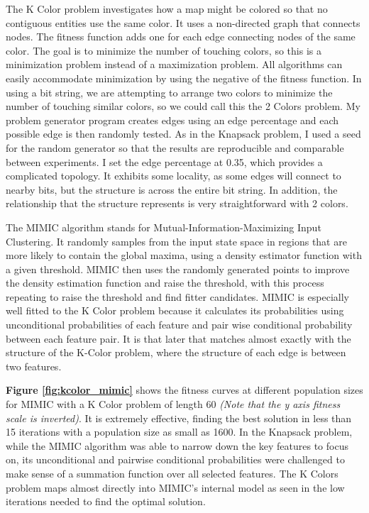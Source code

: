 \documentclass[letterpaper]{article} %
\begin{document}
The K Color problem investigates how a map might be colored so that no contiguous entities use the same color.  It uses a non-directed graph that connects nodes.  The fitness function adds one for each edge connecting nodes of the same color.  The goal is to minimize the number of touching colors, so this is a minimization problem instead of a maximization problem.  All algorithms can easily accommodate minimization by using the negative of the fitness function.   In using a bit string, we are attempting to arrange two colors to minimize the number of touching similar colors, so we could call this the 2 Colors problem.  My problem generator program creates edges using an edge percentage and each possible edge is then randomly tested.  As in the Knapsack problem, I used a seed for the random generator so that the results are reproducible and comparable between experiments.  I set the edge percentage at 0.35, which provides a complicated topology.  It exhibits some locality, as some edges will connect to nearby bits, but the structure is across the entire bit string.  In addition, the relationship that the structure represents is very straightforward with 2 colors. 

The MIMIC algorithm stands for Mutual-Information-Maximizing Input Clustering.  It randomly samples from the input state space in regions that are more likely to contain the global maxima, using a density estimator function with a given threshold.  MIMIC then uses the randomly generated points to improve the density estimation function and raise the threshold, with this process repeating to raise the threshold and find fitter candidates.  MIMIC is especially well fitted to the K Color problem because  it calculates its probabilities using unconditional probabilities of each feature and pair wise conditional probability between each feature pair.  It is that later that matches almost exactly with the structure of the K-Color problem, where the structure of each edge is between two features.  

\textbf{Figure \ref{fig:kcolor_mimic}} shows the fitness curves at different population sizes for MIMIC with a K Color problem of length 60  \emph{(Note that the y axis fitness scale is inverted)}.  It is extremely effective, finding the best solution in less than 15 iterations with a population size as small as 1600.  In the Knapsack problem, while the MIMIC algorithm was able to narrow down the key features to focus on, its unconditional and pairwise conditional probabilities were challenged to make sense of a summation function over all selected features. The K Colors problem maps almost directly into MIMIC's internal model as seen in the low iterations needed to find the optimal solution. 
\end{document}

